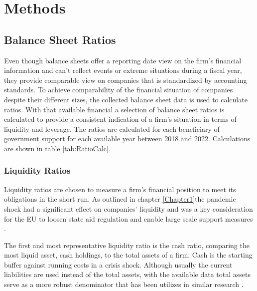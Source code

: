 
\chapter{Methods} %

\label{Chapter4} %


\section{Balance Sheet Ratios}

Even though balance sheets offer a reporting date view on the firm’s financial information and can’t reflect events or extreme situations during a fiscal year, they provide comparable view on companies that is standardized by accounting standards. To achieve comparability of the financial situation of companies despite their different sizes, the collected balance sheet data is used to calculate ratios. With that available financial a selection of balance sheet ratios is calculated to provide a consistent indication of a firm’s situation in terms of liquidity and leverage. The ratios are calculated for each beneficiary of government support for each available year between 2018 and 2022. Calculations are shown in table \ref{tab:RatioCalc}.


\subsection{Liquidity Ratios}

Liquidity ratios are chosen to measure a firm’s financial position to meet its obligations in the short run. As outlined in chapter \ref{Chapter1}the pandemic shock had a significant effect on companies’ liquidity and was a key consideration for the EU to loosen state aid regulation and enable large scale support measures \parencite{eu_com_temporary_2020}.

The first and most representative liquidity ratio is the cash ratio, comparing the most liquid asset, cash holdings, to the total assets of a firm. Cash is the starting buffer against running costs in a crisis shock. Although usually the current liabilities are used instead of the total assets, with the available data total assets serve as a more robust denominator that has been utilizes in similar research \parencite{fernandez-cerezo_firm-level_2021, costa_state-aids_2021,igan_shot_2023}.


